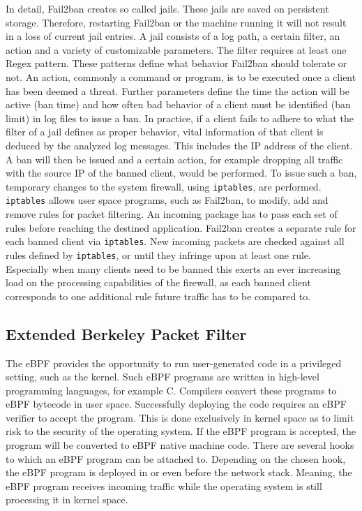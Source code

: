 In detail, Fail2ban creates so called jails.
These jails are saved on persistent storage.
Therefore, restarting Fail2ban or the machine running it will not result in a loss of current jail entries.
A jail consists of a log path, a certain filter, an action and a variety of customizable parameters.
The filter requires at least one \ac{Regex} pattern.
These patterns define what behavior Fail2ban should tolerate or not.
An action, commonly a command or program, is to be executed once a client has been deemed a threat.
Further parameters define the time the action will be active (ban time) and how often bad behavior of a client must be identified (ban limit) in log files to issue a ban.
In practice, if a client fails to adhere to what the filter of a jail defines as proper behavior, vital information of that client is deduced by the analyzed log messages.
This includes the \ac{IP} address of the client.
A ban will then be issued and a certain action, for example dropping all traffic with the source \ac{IP} of the banned client, would be performed.
To issue such a ban, temporary changes to the system firewall, using \texttt{iptables}, are performed.
\texttt{iptables} allows user space programs, such as Fail2ban, to modify, add and remove rules for packet filtering.
An incoming package has to pass each set of rules before reaching the destined application.
Fail2ban creates a separate rule for each banned client via \texttt{iptables}.
New incoming packets are checked against all rules defined by \texttt{iptables}, or until they infringe upon at least one rule.
Especially when many clients need to be banned this exerts an ever increasing load on the processing capabilities of the firewall, as each banned client corresponds to one additional rule future traffic has to be compared to.\cite{mikolajczak:ebpf}

\subsection{Extended Berkeley Packet Filter}
The \ac{eBPF} provides the opportunity to run user-generated code in a privileged setting, such as the kernel.
Such \ac{eBPF} programs are written in high-level programming languages, for example C.
Compilers convert these programs to \ac{eBPF} bytecode in user space.
Successfully deploying the code requires an \ac{eBPF} verifier to accept the program.
This is done exclusively in kernel space as to limit risk to the security of the operating system.
If the \ac{eBPF} program is accepted, the program will be converted to \ac{eBPF} native machine code.
There are several hooks to which an \ac{eBPF} program can be attached to.
Depending on the chosen hook, the \ac{eBPF} program is deployed in or even before the network stack.
Meaning, the \ac{eBPF} program receives incoming traffic while the operating system is still processing it in kernel space.\cite{mikolajczak:ebpf}

